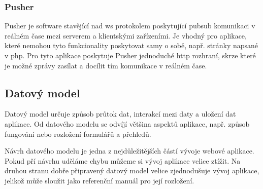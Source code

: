 \subsubsection{Pusher}
\label{subsub:pusher}

Pusher\cite{pusher} je software stavějící nad \acrshort{ws} protokolem poskytující \gls{pubsub} komunikaci v reálném čase mezi serverem a klientskými zařízeními. Je vhodný pro aplikace, které nemohou tyto funkcionality poskytovat samy o sobě, např. stránky napsané v \acrshort{php}. Pro tyto aplikace poskytuje Pusher jednoduché \acrshort{http} rozhraní, skrze které je možné zprávy zasílat a docílit tím komunikace v reálném čase.

\subsection{Datový model}

Datový model\cite{data-model} určuje způsob průtok dat, interakcí mezi daty a uložení dat aplikace. Od datového modelu se odvíjí většina aspektů aplikace, např. způsob fungování nebo rozložení formulářů a přehledů.

Návrh datového modelu je jedna z nejdůležitějších částí vývoje webové aplikace.  Pokud pří návrhu uděláme chybu můžeme si vývoj aplikace velice ztížit. Na druhou stranu dobře připravený datový model velice zjednodušuje vývoj aplikace, jelikož může sloužit jako referenční manuál pro její rozložení.